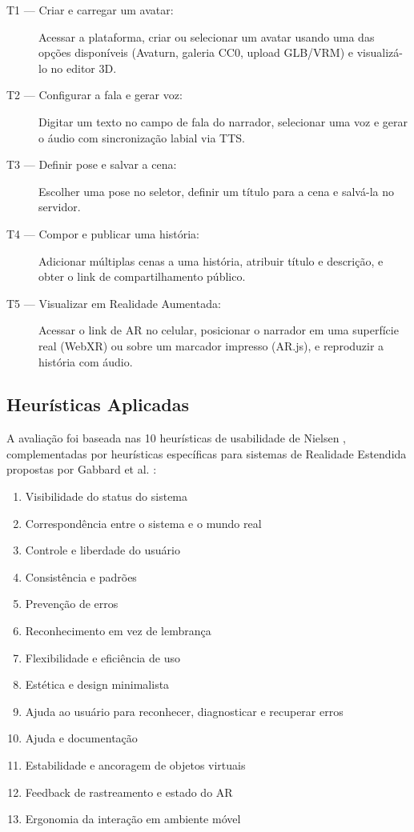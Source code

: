 \documentclass[
  12pt,
  openright,
  twoside,
  a4paper,
  english,
  brazil
]{abntex2}
\begin{document}
\begin{description}
  \item[T1 — Criar e carregar um avatar:]
    Acessar a plataforma, criar ou selecionar um avatar usando uma das
    opções disponíveis (Avaturn, galeria CC0, upload GLB/VRM) e
    visualizá-lo no editor 3D.
  \item[T2 — Configurar a fala e gerar voz:]
    Digitar um texto no campo de fala do narrador, selecionar uma voz
    e gerar o áudio com sincronização labial via TTS.
  \item[T3 — Definir pose e salvar a cena:]
    Escolher uma pose no seletor, definir um título para a cena e
    salvá-la no servidor.
  \item[T4 — Compor e publicar uma história:]
    Adicionar múltiplas cenas a uma história, atribuir título e
    descrição, e obter o link de compartilhamento público.
  \item[T5 — Visualizar em Realidade Aumentada:]
    Acessar o link de AR no celular, posicionar o narrador em uma
    superfície real (WebXR) ou sobre um marcador impresso (AR.js),
    e reproduzir a história com áudio.
\end{description}

\subsection{Heurísticas Aplicadas}
\label{subsec:heuristicas}

A avaliação foi baseada nas 10 heurísticas de usabilidade de Nielsen
\cite{nielsen1994heuristics}, complementadas por heurísticas específicas
para sistemas de Realidade Estendida propostas por Gabbard et al.
\cite{gabbard2006xr}:

\begin{enumerate}
  \item Visibilidade do status do sistema
  \item Correspondência entre o sistema e o mundo real
  \item Controle e liberdade do usuário
  \item Consistência e padrões
  \item Prevenção de erros
  \item Reconhecimento em vez de lembrança
  \item Flexibilidade e eficiência de uso
  \item Estética e design minimalista
  \item Ajuda ao usuário para reconhecer, diagnosticar e recuperar erros
  \item Ajuda e documentação
  \item[XR1.] Estabilidade e ancoragem de objetos virtuais
  \item[XR2.] Feedback de rastreamento e estado do AR
  \item[XR3.] Ergonomia da interação em ambiente móvel
\end{enumerate}
\end{document}
